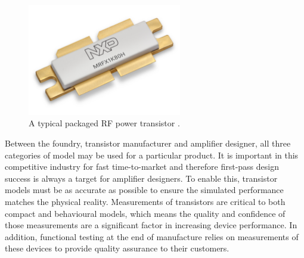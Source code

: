 \documentclass[../thesis/thesis.tex]{subfiles}
\begin{document}
\begin{figure}
	\centering
	\includegraphics[width=0.6\textwidth]{ch1_rfpa}
	\caption{A typical packaged RF power transistor \cite{nxp_pic}.}
	\label{ch1_fig_rfpa}
\end{figure}

Between the foundry, transistor manufacturer and amplifier designer, all three categories of model may be used for a particular product. It is important in this competitive industry for fast time-to-market and therefore first-pass design success is always a target for amplifier designers. To enable this, transistor models must be as accurate as possible to ensure the simulated performance matches the physical reality. Measurements of transistors are critical to both compact and behavioural models, which means the quality and confidence of those measurements are a significant factor in increasing device performance. In addition, functional testing at the end of manufacture relies on measurements of these devices to provide quality assurance to their customers.
\end{document}
